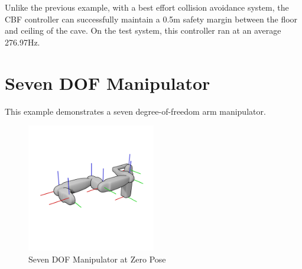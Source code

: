 \noindent Unlike the previous example, with a best effort collision avoidance system, the CBF controller can successfully maintain a 0.5m safety margin between the floor and ceiling of the cave. On the test system, this controller ran at an average 276.97Hz.

\section{Seven DOF Manipulator}  \label{sec:7dof}

\noindent This example demonstrates a seven degree-of-freedom arm manipulator.

\begin{figure}[H]
    \centering
    \includegraphics[width=0.5\textwidth]{Figures/Examples/7DOF/Zeroed.png}
    \caption{Seven DOF Manipulator at Zero Pose}
    \label{fig:7dofzero}
\end{figure}

